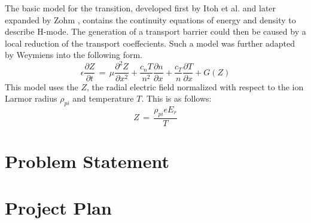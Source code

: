 \documentclass{article}
\begin{document}
The basic model for the transition, developed first by Itoh et al. \cite{itoh_edge_1991} and later expanded by Zohm \cite{zohm_dynamic_1994}, contains the continuity equations of energy and density to describe H-mode.
The generation of a transport barrier could then be caused by a local reduction of the transport coeffecients.
Such a model was further adapted by Weymiens \cite{weymiens_bifurcation_2014} into the following form.
\begin{equation}
	\epsilon \frac{\partial Z}{\partial t} \,=\, \mu \frac{\partial^2 Z}{\partial x^2} + \frac{c_n T}{n^2} \frac{\partial n}{\partial x} + \frac{c_T}{n} \frac{\partial T}{\partial x} + G(Z)
	\label{eq:pde}
\end{equation}
This model uses the $Z$, the radial electric field normalized with respect to the ion Larmor radius $\rho_{pi}$ and temperature $T$.
This is as follows:
\begin{equation}
	Z \,=\, \frac{\rho_{pi} e E_r}{T}
	\label{eq:normalization}
\end{equation}


\section{Problem Statement}



\section{Project Plan}





\end{document}
